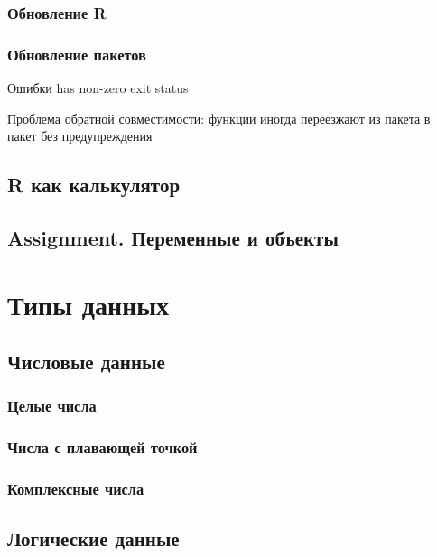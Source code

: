 \documentclass[
  letterpaper,
  DIV=11,
  numbers=noendperiod]{scrreprt}
\theoremstyle{definition}
\theoremstyle{remark}
\begin{document}
\subsection{Обновление R}\label{rbasics-updates-r}

\subsection{Обновление пакетов}\label{rbasics-updates-packages}

Ошибки has non-zero exit status

Проблема обратной совместимости: функции иногда переезжают из пакета в
пакет без предупреждения

\section{R как калькулятор}\label{rbasics-r-calculator}

\section{Assignment. Переменные и
объекты}\label{rbasics-vars-and-objects}


\chapter{Типы данных}\label{rdtypes}

\section{Числовые данные}\label{rdtypes-numbers}

\subsection{Целые числа}\label{rdtypes-integer}

\subsection{Числа с плавающей точкой}\label{rdtypes-numeric}

\subsection{Комплексные числа}\label{rdtypes-complex}

\section{Логические данные}\label{rdtypes-logic}
\end{document}
